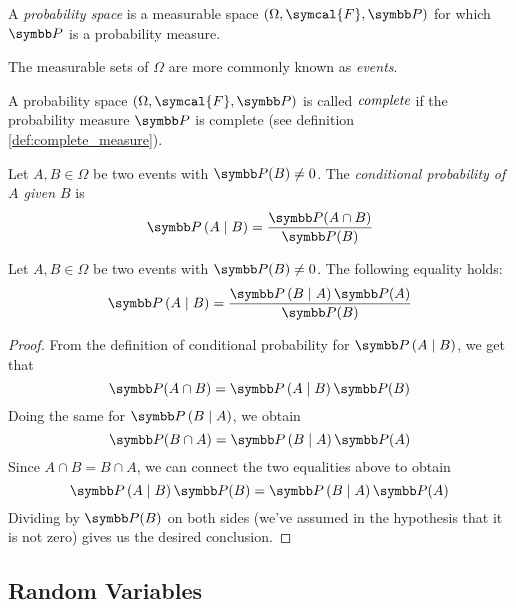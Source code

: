 \begin{definition}
A \emph{probability space} is a measurable space \(\left(\Omega, \symcal{F}, \probability\right)\) for which \(\probability\) is a probability measure.
\end{definition}

\begin{remark*}
The measurable sets of \(\Omega\) are more commonly known as \emph{events}.
\end{remark*}

\begin{definition}
A probability space \(\left(\Omega, \symcal{F}, \probability\right)\) is called \(\emph{complete}\) if the probability measure \(\probability\) is complete (see definition \ref{def:complete_measure}).
\end{definition}

\begin{definition}
Let \(A, B \in \Omega\) be two events with \(\probability(B) \neq 0\). The \emph{conditional probability of \(A\) given \(B\)} is
\[
    \probability\given{A}{B} = \frac{\probability(A \cap B)}{\probability(B)}
\]
\end{definition}

\begin{theorem}[Bayes]
Let \(A, B \in \Omega\) be two events with \(\probability(B) \neq 0\). The following equality holds:
\[
    \probability\given{A}{B} = \frac{\probability\given{B}{A} \probability(A)}{\probability(B)}
\]
\end{theorem}
\begin{proof}
From the definition of conditional probability for \(\probability\given{A}{B}\), we get that
\[
    \probability(A \cap B) = \probability\given{A}{B} \probability(B)
\]
Doing the same for \(\probability\given{B}{A}\), we obtain
\[
    \probability(B \cap A) = \probability\given{B}{A} \probability(A)
\]
Since \(A \cap B = B \cap A\), we can connect the two equalities above to obtain
\[
    \probability\given{A}{B} \probability(B) = \probability\given{B}{A} \probability(A)
\]
Dividing by \(\probability(B)\) on both sides (we've assumed in the hypothesis that it is not zero) gives us the desired conclusion.
\end{proof}

\subsection*{Random Variables}

